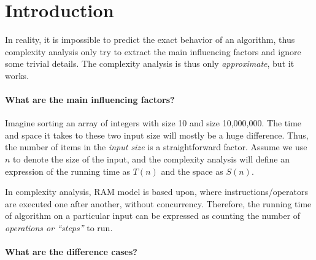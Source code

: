 \documentclass[../main.tex]{subfiles}
\begin{document}
\section{Introduction}
In reality, it is impossible to predict the exact behavior of an algorithm, thus complexity analysis only try to extract the main influencing factors and ignore some trivial details. The complexity analysis is thus only \textit{approximate}, but it works. 

\paragraph{What are the main influencing factors? }

Imagine sorting an array of integers with size 10 and size 10,000,000. The time and space it takes to these two input size will mostly be a huge difference. Thus, the number of items in the \textit{input size} is a straightforward factor. Assume we use $n$ to denote the size of the input, and the complexity analysis will define an expression of the running time as $T(n)$ and the space as $S(n)$. 

In complexity analysis, RAM model is based upon, where instructions/operators are executed one after another, without concurrency. Therefore, the running time of algorithm on a particular input can be expressed as counting the number of \textit{operations or ``steps''} to run. 

\paragraph{What are the difference cases?}
\end{document}
